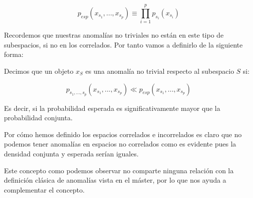 $$p_{esp}(x_{s_1} , ... , x_{s_p}) \equiv \prod_{i=1}^{p}p_{s_i}(x_{s_i})$$

Recordemos que nuestras anomalías no triviales no están en este tipo de subespacios, si no en los correlados. Por tanto vamos a definirlo de la siguiente forma:

\begin{definicion}
	Decimos que un objeto $x_{S}$ es una anomalía no trivial respecto al subespacio $S$ si:
	
	$$p_{s_1 , ... , s_p}(x_{s_1} , ... , x_{s_p}) \ll p_{esp}(x_{s_1} , ... , x_{s_p})$$
	
	Es decir, si la probabilidad esperada es significativamente mayor que la probabilidad conjunta.
\end{definicion}

Por cómo hemos definido los espacios correlados e incorrelados es claro que no podemos tener anomalías en espacios no correlados como es evidente pues la densidad conjunta y esperada serían iguales.

Este concepto como podemos observar no comparte ninguna relación con la definición clásica de anomalías vista en el máster, por lo que nos ayuda a complementar el concepto.